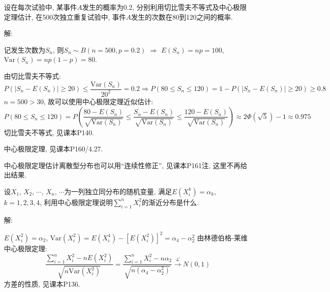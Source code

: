 \documentclass[standard]{ExBook}
\begin{document}
\begin{qitems}
\vspace{-5em}

    \begin{bbox}
    \begin{shaded}
        \qitem
设在每次试验中, 某事件$A$发生的概率为0.2, 分别利用切比雪夫不等式及中心极限定理估计, 在500次独立重复试验中, 事件$A$发生的次数在80到120之间的概率.
    \end{shaded}
    \end{bbox}

\vspace{-5em}

    \begin{bbox}
解: 

记发生次数为$S_n$, 则$S_n\sim B(n=500,p=0.2)$ $\Longrightarrow$ $E(S_n)=np=100$, $\mathrm{Var}(S_n)=np(1-p)=80$.

 由切比雪夫不等式:
$$P(|S_n-E(S_n)|\geq 20)\leq \displaystyle\frac{\mathrm{Var}(S_n)}{20^2}=0.2 \Longrightarrow P(80 \leq S_n \leq 120)=1-P(|S_n-E(S_n)|\geq 20)\geq 0.8$$
 $n=500>30$, 故可以使用中心极限定理近似估计:
$$\displaystyle P(80\leq S_n\leq 120)=P\left(\frac{80-E(S_n)}{\sqrt{\mathrm{Var}(S_n)}} \leq \frac{S_n-E(S_n)}{\sqrt{\mathrm{Var}(S_n)}} \leq \frac{120-E(S_n)}{\sqrt{\mathrm{Var}(S_n)}}\right) \approx 2\Phi\left(\sqrt{5}\right)-1\approx0.975$$
\textcolor{themeColor}{\selectfont {} 切比雪夫不等式, 见课本P140.}

\textcolor{themeColor}{\selectfont {} 中心极限定理, 见课本P160/4.27.}

\textcolor{themeColor}{\selectfont {} 中心极限定理估计离散型分布也可以用``连续性修正'', 见课本P161注, 这里不再给出结果.}
    \end{bbox}

\vspace{-5em}

    \begin{bbox}
    \begin{shaded}
        \qitem
设$X_1$, $X_2$, $\cdots$, $X_n$, $\cdots$为一列独立同分布的随机变量, 满足$E(X_i^k)=\alpha_k$, $k=1,2,3,4$, 利用中心极限定理说明$\displaystyle\sum\limits_{i=1}^{n}X_{i}^2$的渐近分布是什么.
    \end{shaded}
    \end{bbox}

\vspace{-5em}

    \begin{bbox}
解: 

$E(X_i^2)=\alpha_2$, $\mathrm{Var}(X_i^2)=E(X_i^4)-\left[E(X_i^2)\right]^2=\alpha_4-\alpha_2^2$
由林德伯格-莱维中心极限定理:
$$\displaystyle\frac{\sum\limits_{i=1}^{n}X_i^2-n E(X_i^2)}{\sqrt{n \mathrm{Var}(X_i^2)}}=\frac{\sum\limits_{i=1}^{n}X_i^2-n \alpha_2}{\sqrt{n(\alpha_4-\alpha_2^2)}} \xrightarrow{\mathcal{L}} N(0,1)$$
\textcolor{themeColor}{\selectfont {}
方差的性质, 见课本P136.}


\end{bbox}
\end{qitems}
\end{document}
